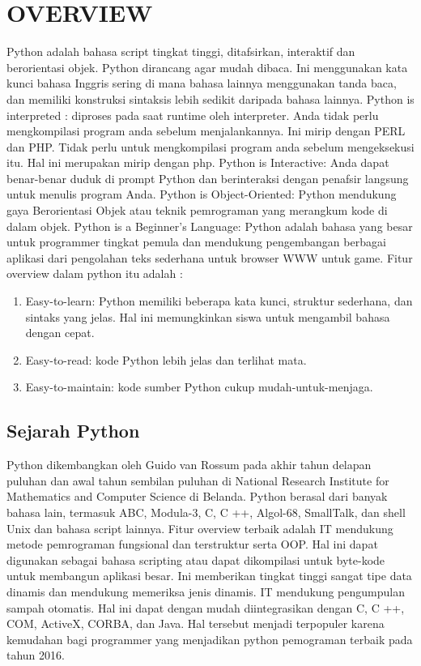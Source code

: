 \section {OVERVIEW}
Python adalah bahasa script tingkat tinggi, ditafsirkan, interaktif dan berorientasi objek. Python dirancang agar mudah dibaca. Ini menggunakan kata kunci bahasa Inggris sering di mana bahasa lainnya menggunakan tanda baca, dan memiliki konstruksi sintaksis lebih sedikit daripada bahasa lainnya.
Python is interpreted : diproses pada saat runtime oleh interpreter. Anda tidak perlu mengkompilasi program anda sebelum menjalankannya. Ini mirip dengan PERL dan PHP.
Tidak perlu untuk mengkompilasi program anda sebelum mengeksekusi itu. Hal ini merupakan mirip dengan php.
Python is Interactive: Anda dapat benar-benar duduk di prompt Python dan berinteraksi dengan penafsir langsung untuk menulis program Anda.
Python is Object-Oriented: Python mendukung gaya Berorientasi Objek atau teknik pemrograman yang merangkum kode di dalam objek.
Python is a Beginner's Language: Python adalah bahasa yang besar untuk programmer tingkat pemula dan mendukung pengembangan berbagai aplikasi dari pengolahan teks sederhana untuk browser WWW untuk game.
Fitur overview dalam python itu adalah :
\begin {enumerate}
\item Easy-to-learn: Python memiliki beberapa kata kunci, struktur sederhana, dan sintaks yang jelas. Hal ini memungkinkan siswa untuk mengambil bahasa dengan cepat.
\item Easy-to-read: kode Python lebih jelas dan terlihat mata.
\item Easy-to-maintain: kode sumber Python cukup mudah-untuk-menjaga.
\end {enumerate}

\subsection{Sejarah Python}
Python dikembangkan oleh Guido van Rossum pada akhir tahun delapan puluhan dan awal tahun sembilan puluhan di National Research Institute for Mathematics and Computer Science di Belanda. Python berasal dari banyak bahasa lain, termasuk ABC, Modula-3, C, C ++, Algol-68, SmallTalk, dan shell Unix dan bahasa script lainnya.
Fitur overview terbaik adalah IT mendukung metode pemrograman fungsional dan terstruktur serta OOP. Hal ini dapat digunakan sebagai bahasa scripting atau dapat dikompilasi untuk byte-kode untuk membangun aplikasi besar. Ini memberikan tingkat tinggi sangat tipe data dinamis dan mendukung memeriksa jenis dinamis. IT mendukung pengumpulan sampah otomatis. Hal ini dapat dengan mudah diintegrasikan dengan C, C ++, COM, ActiveX, CORBA, dan Java. Hal tersebut menjadi terpopuler karena kemudahan bagi programmer yang menjadikan python pemograman terbaik pada tahun 2016.

